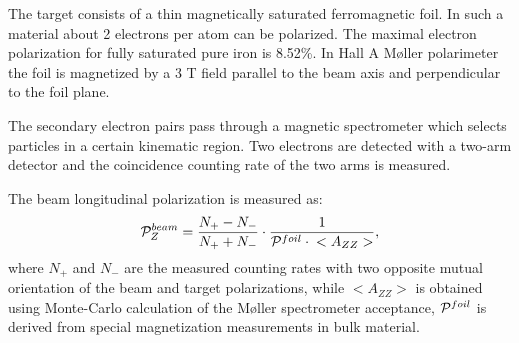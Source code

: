 {The target consists of a thin magnetically saturated ferromagnetic foil.
In such a material about 2 electrons per atom can be 
polarized.
The maximal electron polarization for fully saturated pure iron is 8.52\%.
In Hall A M{\o}ller polarimeter the foil is magnetized by a 3 T field parallel to the beam
axis and perpendicular to the foil plane.

The secondary electron pairs pass through a magnetic spectrometer
which selects particles in a certain kinematic region. Two electrons
are detected with a two-arm detector and the 
coincidence counting rate of the two arms is measured.

The beam longitudinal polarization is measured as:
\begin{equation}
           {\cal P}^{beam}_{Z} = \frac{N_{+}-N_{-}}{N_{+}+N_{-}}\cdot{}
      \frac{1}{{\cal P}^{foil}\cdot{}<A_{ZZ}>},
\end{equation}
where $N_{+}$ and $N_{-}$ are the measured counting rates with two opposite
mutual orientation of the beam and target polarizations, while 
$<A_{ZZ}>$ is obtained using Monte-Carlo calculation of the M{\o}ller 
spectrometer acceptance, ${\cal P}^{foil}$ is derived from special
magnetization measurements in bulk material.


} %

